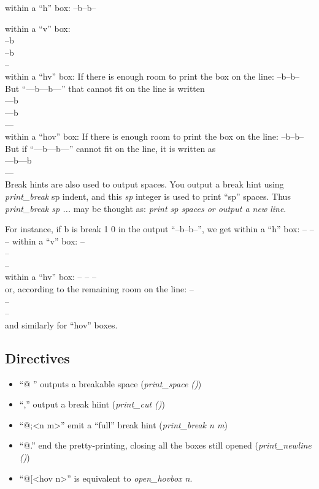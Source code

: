 within a ``h'' box: --b--b--

within a ``v'' box: \\
--b \\
--b \\
--   \\
   
within a ``hv'' box: If there is enough room to print the box on the
line: --b--b--
But ``---b---b---'' that cannot fit on the line is written \\
---b \\
---b \\
--- \\

within a ``hov'' box:
If there is enough room to print the box on the line:
   --b--b--
But if ``---b---b---'' cannot fit on the line, it is written as \\
   ---b---b \\
   --- \\

Break hints are also used to output spaces. You output a break hint
using \textit{print\_break} sp indent, and this \textit{sp} integer is used to print
``sp'' spaces. Thus \textit{print\_break sp ... }may be thought as: \textit{print sp
  spaces or output a new line}.


For instance, if b is break 1 0 in the output ``--b--b--'', we get
within a ``h'' box:
   -- -- --
within a ``v'' box:
   -- \\
   -- \\
   -- \\
within a ``hv'' box:
   -- -- -- \\
or, according to the remaining room on the line:
   -- \\ 
   -- \\ 
   -- \\ 
and similarly for ``hov'' boxes.

\subsection{Directives}
\label{sec:directives}
\begin{itemize}
\item ``@ '' outputs a breakable space (\textit{print\_space ()})

\item ``\@,''  output a break hiint (\textit{print\_cut ()})

\item ``@;<n m>'' emit a ``full'' break hint (\textit{print\_break n m})

\item ``@.'' end the pretty-printing, closing all the boxes still opened
(\textit{print\_newline ()})

\item ``@[<hov n>'' is equivalent to \textit{open\_hovbox n}.
\end{itemize}
